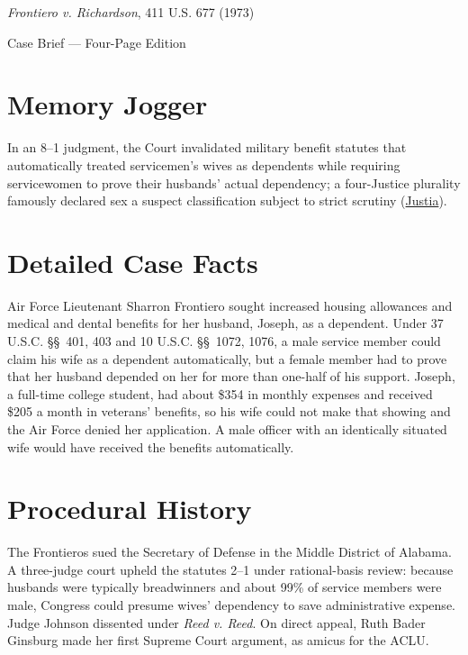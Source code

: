 \documentclass[12pt]{article}
\begin{document}
\begin{center}
{\LARGE \textit{Frontiero v. Richardson}, 411 U.S. 677 (1973)\par}
\vspace{0.8em}
{\large Case Brief --- Four-Page Edition\par}
\end{center}
\vspace{1em}

\section{Memory Jogger}

In an 8--1 judgment, the Court invalidated military benefit statutes that automatically treated servicemen's wives as dependents while requiring servicewomen to prove their husbands' actual dependency; a four-Justice plurality famously declared sex a suspect classification subject to strict scrutiny (\href{https://supreme.justia.com/cases/federal/us/411/677/}{Justia}).

\section{Detailed Case Facts}

Air Force Lieutenant Sharron Frontiero sought increased housing allowances and medical and dental benefits for her husband, Joseph, as a dependent. Under 37 U.S.C. \S\S~401, 403 and 10 U.S.C. \S\S~1072, 1076, a male service member could claim his wife as a dependent automatically, but a female member had to prove that her husband depended on her for more than one-half of his support. Joseph, a full-time college student, had about \$354 in monthly expenses and received \$205 a month in veterans' benefits, so his wife could not make that showing and the Air Force denied her application. A male officer with an identically situated wife would have received the benefits automatically.

\section{Procedural History}

The Frontieros sued the Secretary of Defense in the Middle District of Alabama. A three-judge court upheld the statutes 2--1 under rational-basis review: because husbands were typically breadwinners and about 99\% of service members were male, Congress could presume wives' dependency to save administrative expense. Judge Johnson dissented under \textit{Reed v. Reed}. On direct appeal, Ruth Bader Ginsburg made her first Supreme Court argument, as amicus for the ACLU.
\end{document}
